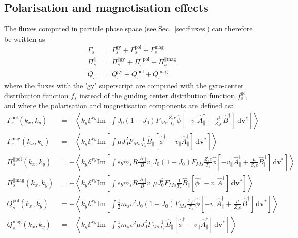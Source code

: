 \documentclass[a4paper]{report}
\begin{document}
\subsection{Polarisation and magnetisation effects}
The fluxes computed in particle phase space (see Sec.~\ref{sec:fluxes}) can therefore be written as
\begin{align*}
\Gamma_s & = \Gamma_s^\textrm{gy} + \Gamma_s^\textrm{pol} + \Gamma_s^\textrm{mag} \\
\Pi^\parallel_s & = \Pi_s^{\parallel \textrm{gy}} + \Pi_s^{\parallel \textrm{pol}} + \Pi_s^{\parallel \textrm{mag}} \\
Q_s & = Q_s^\textrm{gy} + Q_s^\textrm{pol} + Q_s^\textrm{mag}
\end{align*}
where the fluxes with the 'gy' superscript are computed with the gyro-center distribution function $f_s$ instead of the guiding center distribution function $f_s^\textrm{gc}$, and where the polarisation and magnetisation components are defined as: 
\begin{align*}
\Gamma_s^\textrm{pol}(k_x,k_y) & = - \left<k_y\mathcal{E}^{ry} \textrm{Im}\left[\int J_0(1-J_0)F_{Ms}\frac{Z_s e}{T_s}\hat{\phi}\left[-v_\parallel \hat{A}_\parallel^\dagger + \frac{\mu}{Z_s e}\hat{B}_\parallel^\dagger \right]  \,\textrm{d}\mathbf{v^*} \right]\right>\\
\Gamma_s^\textrm{mag}(k_x,k_y) & = - \left<k_y\mathcal{E}^{ry} \textrm{Im}\left[\int \mu J_0^2F_{Ms}\frac{1}{T_s}\hat{B}_\parallel\left[\hat{\phi}^\dagger-v_\parallel \hat{A}_\parallel^\dagger \right]  \,\textrm{d}\mathbf{v^*} \right]\right>\\
\Pi_s^{\parallel \textrm{pol}}(k_x,k_y) & = - \left<k_y\mathcal{E}^{ry} \textrm{Im}\left[\int s_bm_sR\frac{|B_t|}{B}v_\parallel J_0(1-J_0)F_{Ms}\frac{Z_s e}{T_s}\hat{\phi}\left[-v_\parallel \hat{A}_\parallel^\dagger + \frac{\mu}{Z_s e}\hat{B}_\parallel^\dagger \right]  \,\textrm{d}\mathbf{v^*} \right]\right>\\
\Pi_s^{\parallel \textrm{mag}}(k_x,k_y) & = - \left<k_y\mathcal{E}^{ry} \textrm{Im}\left[\int s_bm_sR\frac{|B_t|}{B}v_\parallel\mu J_0^2F_{Ms}\frac{1}{T_s}\hat{B}_\parallel\left[\hat{\phi}^\dagger-v_\parallel \hat{A}_\parallel^\dagger \right]  \,\textrm{d}\mathbf{v^*} \right]\right>\\
Q_s^\textrm{pol}(k_x,k_y) & = - \left<k_y\mathcal{E}^{ry} \textrm{Im}\left[\int  \frac{1}{2}m_sv^2J_0(1-J_0)F_{Ms}\frac{Z_s e}{T_s}\hat{\phi}\left[-v_\parallel \hat{A}_\parallel^\dagger + \frac{\mu}{Z_s e}\hat{B}_\parallel^\dagger \right]  \,\textrm{d}\mathbf{v^*} \right]\right>\\
Q_s^\textrm{mag}(k_x,k_y) & = - \left<k_y\mathcal{E}^{ry} \textrm{Im}\left[\int  \frac{1}{2}m_sv^2\mu J_0^2F_{Ms}\frac{1}{T_s}\hat{B}_\parallel\left[\hat{\phi}^\dagger-v_\parallel \hat{A}_\parallel^\dagger \right]  \,\textrm{d}\mathbf{v^*} \right]\right>
\end{align*}
\end{document}
